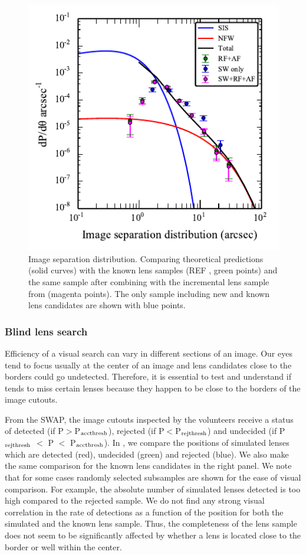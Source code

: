 \documentclass[useAMS,usenatbib,a4paper]{mn2e}
\begin{document}
\begin{figure}
\begin{center}
\includegraphics[scale=1.2]{sw-cfhtls-figs/isd_cfhtls_sw.pdf}
\caption{ \label{fig:isd} Image separation distribution. Comparing
theoretical predictions (solid curves) with the \cfhtls known lens
samples (REF , green points) and the same \cfhtls sample after combining
with the incremental lens sample from \sw (magenta points). The \sw only
sample including new and known lens candidates are shown with blue
points. }
\end{center}
\end{figure}

\subsubsection{Blind lens search}
Efficiency of a visual search can vary in different sections of an
image. Our eyes tend to focus usually at the center of an image and lens
candidates close to the borders could go undetected. Therefore, it is
essential to test and understand if \sw tends to miss certain lenses
because they happen to be close to the borders of the image cutouts.
 
From the SWAP, the image cutouts inspected by the \sw volunteers receive
a status of detected (if P$>$P$_{\rm acc thresh}$), rejected (if
P$<$P$_{\rm rej thresh}$) and undecided (if P$_{\rm rej thresh}$ $<$ P
$<$ P$_{\rm acc thresh}$). In , we compare the
positions of simulated lenses which are detected (red), undecided
(green) and rejected (blue). We also make the same comparison for the
known lens candidates in the right panel.  We note that for some cases
randomly selected subsamples are shown for the ease of visual
comparison. For example, the absolute number of simulated lenses
detected is too high compared to the rejected sample. We do not find any
strong visual correlation in the rate of detections as a function of the
position for both the simulated and the known lens sample. Thus, the
completeness of the lens sample does not seem to be significantly
affected by whether a lens is located close to the border or well within
the center.
\end{document}
